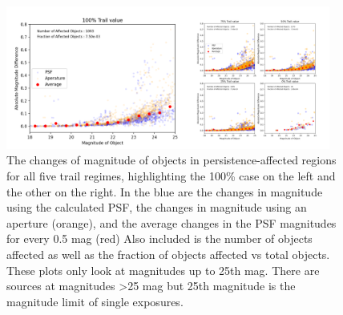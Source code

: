 \documentclass[DM,authoryear,toc]{lsstdoc}
\begin{document}
\begin{figure}[!htp]
  \centering
  \includegraphics[width=0.95\textwidth, angle=0]{Combined_New_mag_plot.png}
  \caption{
  The changes of magnitude of objects in persistence-affected regions for all five trail regimes, highlighting the 100\% case on the left and the other on the right. 
  In the blue are the changes in magnitude using the calculated PSF, the changes in magnitude using an aperture (orange), and the average changes in the PSF magnitudes for every 0.5 mag (red)
  Also included is the number of objects affected as well as the fraction of objects affected vs total objects.
  These plots only look at magnitudes up to 25th mag.
  There are sources at magnitudes >25 mag but 25th magnitude is the magnitude limit of single exposures.
  }\label{fig:affected_objects_all}
\end{figure}





\end{document}
